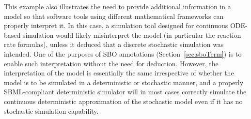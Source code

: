 
This example also illustrates the need to provide additional
information in a model so that software tools using different
mathematical frameworks can properly interpret it.  In this case,
a simulation tool designed for continuous ODE-based simulation
would likely misinterpret the model (in particular the reaction
rate formulas), unless it deduced that a discrete stochastic
simulation was intended.  One of the purposes of SBO annotations
(Section~\ref{sec:sboTerm}) is to enable such interpretation
without the need for deduction. However, the interpretation of the
model is essentially the same irrespective of whether the model is
to be simulated in a deterministic or stochastic manner, and a
properly SBML-compliant deterministic simulator will in most cases
correctly simulate the continuous deterministic approximation
of the stochastic model even if it has no stochastic simulation
capability.

\clearpage 

